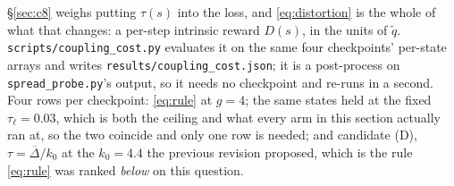 \documentclass{article}
\newcommand{\gapbar}{\overline{\Delta}}
\begin{document}
\S\ref{sec:c8} weighs putting $\tau(s)$ into the loss, and \eqref{eq:distortion} is the whole of
what that changes: a per-step intrinsic reward $D(s)$, in the units of $\tilde{q}$.
\texttt{scripts/coupling\_cost.py} evaluates it on the same four checkpoints' per-state arrays
and writes \texttt{results/coupling\_cost.json}; it is a post-process on
\texttt{spread\_probe.py}'s output, so it needs no checkpoint and re-runs in a second. Four
rows per checkpoint: \eqref{eq:rule} at $g = 4$; the same states held at the fixed
$\tau_\ell = 0.03$, which is both the ceiling and what every arm in this section actually ran at,
so the two coincide and only one row is needed; and candidate (D), $\tau = \gapbar/k_0$ at the
$k_0 = 4.4$ the previous revision proposed, which is the rule \eqref{eq:rule} was ranked
\emph{below} on this question.
\end{document}
